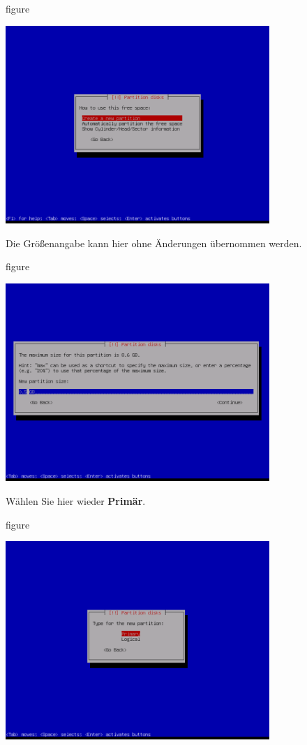 \begin{nofloat}{figure}
\begin{center}
\includegraphics[width=0.75\textwidth]{screenshots/15_ubuntu_install.png}
\end{center}
\end{nofloat}

\pagebreak
Die Größenangabe kann hier ohne Änderungen übernommen werden.

\begin{nofloat}{figure}
\begin{center}
\includegraphics[width=0.75\textwidth]{screenshots/16_ubuntu_install.png}
\end{center}
\end{nofloat}

Wählen Sie hier wieder \textbf{Primär}.

\begin{nofloat}{figure}
\begin{center}
\includegraphics[width=0.75\textwidth]{screenshots/17_ubuntu_install.png}
\end{center}
\end{nofloat}

